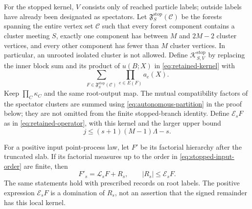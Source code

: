 For the stopped kernel, $V$ consists only of reached particle labels;
outside labels have already been designated as spectators.  Let
$\mathfrak F^{\mathrm{stop}}_S(\mathcal C)$ be the forests spanning the
entire vertex set $\mathcal C$ such that every forest component contains
a cluster meeting $S$, exactly one component has between $M$ and $2M-2$
cluster vertices, and every other component has fewer than $M$ cluster
vertices.  In particular, an unrooted isolated cluster is not allowed.
Define $\mathcal K^{\mathrm{stop}}_{S,V}$ by replacing the inner block
sum and its product of $u(B;X)$ in \eqref{eq:retained-kernel} with
\[
 \sum_{F\in\mathfrak F^{\mathrm{stop}}_S(\mathcal C)}
                            \prod_{e\in E(F)}a_e(X).
\]
Keep $\prod_C\kappa_C$ and the same root-output map.  The mutual
compatibility factors of the spectator clusters are summed using
\eqref{eq:autonomous-partition} in the proof below; they are not omitted
from the finite stopped-branch identity.  Define $\mathcal E_sF$ as in
\eqref{eq:retained-operator}, with this kernel and the larger upper bound
\begin{equation}\label{eq:stopped-input-order}
 j\le (s+1)(M-1)\Lambda-s.
\end{equation}

\begin{lemma}
\label{lem:one-slab-expansion}
For a positive input point-process law, let $F'$ be its factorial
hierarchy after the truncated slab.  If its factorial measures up to the
order in \eqref{eq:stopped-input-order} are finite, then
\begin{equation}\label{eq:one-slab-exact}
 F'_s=\mathcal L_sF+R_s,\qquad |R_s|\le\mathcal E_sF.
\end{equation}
The same statements hold with prescribed records on root labels.
The positive expression $\mathcal E_sF$ is a domination of $R_s$, not an
assertion that the signed remainder has this local kernel.
\end{lemma}

